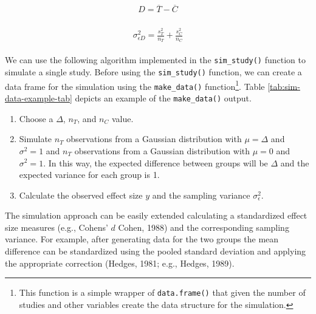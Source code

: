 \documentclass[
  man,floatsintext]{apa6}
\providecommand{\tightlist}{%
  \setlength{\itemsep}{0pt}\setlength{\parskip}{0pt}}
\begin{document}
\color{red}

\begin{align}
\begin{gathered}
D = \overline{T} - \overline{C}
\label{eq:effsize}
\end{gathered}
\end{align}

\begin{align}
\begin{gathered}
\sigma_{\epsilon D}^{2} = \frac{s^2_T}{n_T} + \frac{s^2_C}{n_C}
\label{eq:effsizevar}
\end{gathered}
\end{align}

\color{black}

We can use the following algorithm implemented in the \texttt{sim\_study()} function to simulate a single study. Before using the \texttt{sim\_study()}
function, we can create a data frame for the simulation using the \texttt{make\_data()} function\footnote{This function is a simple wrapper of \texttt{data.frame()} that given the number of studies and other variables create the data structure for the simulation.}. Table \ref{tab:sim-data-example-tab} depicts an example of the \texttt{make\_data()} output.

\color{red}

\begin{enumerate}
\def\labelenumi{\arabic{enumi}.}
\tightlist
\item
  Choose a \(\Delta\), \(n_{T}\), and \(n_{C}\) value.
\item
  Simulate \(n_{T}\) observations from a Gaussian distribution with \(\mu = \Delta\) and \(\sigma^{2} = 1\) and \(n_{T}\) observations from a Gaussian distribution with \(\mu = 0\) and \(\sigma^{2} = 1\). In this way, the expected difference between groups will be \(\Delta\) and the expected variance for each group is 1.
\item
  Calculate the observed effect size \(y\) and the sampling variance \(\sigma_{\epsilon}^{2}\).
\end{enumerate}

The simulation approach can be easily extended calculating a standardized effect size measures (e.g., Cohens' \(d\) Cohen, 1988) and the corresponding sampling variance. For example, after generating data for the two groups the mean difference can be standardized using the pooled standard deviation and applying the appropriate correction (Hedges, 1981; e.g., Hedges, 1989).

\color{black}
\end{document}
